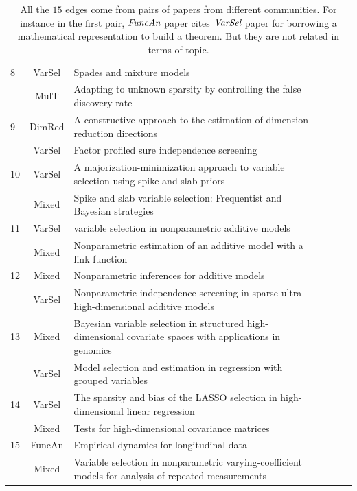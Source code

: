 \documentclass[AMS,STIX1COL]{WileyNJD-v2}
\begin{document}
{\begin{table}[htbp]
\begin{tabular}{lclclcl}
8    & VarSel    & Spades and mixture models & \\
     & MulT      & Adapting to unknown sparsity by controlling the false discovery rate                          & \\
9    & DimRed    & A constructive approach to the estimation of dimension reduction directions                   & \\
     & VarSel    & Factor profiled sure independence screening & \\
10   & VarSel    & A majorization-minimization approach to variable selection using spike and slab priors        & \\
     & Mixed     & Spike and slab variable selection: Frequentist and Bayesian strategies                        & \\
11   & VarSel    & variable selection in nonparametric additive models & \\
     & Mixed     & Nonparametric estimation of an additive model with a link function                            & \\
12   & Mixed     & Nonparametric inferences for additive models & \\
     & VarSel    & Nonparametric independence screening in sparse ultra-high-dimensional additive models         & \\
13   & Mixed     & Bayesian variable selection in structured high-dimensional covariate spaces with applications in genomics & \\
     & VarSel    & Model selection and estimation in regression with grouped variables                           & \\
14   & VarSel    & The sparsity and bias of the LASSO selection in high-dimensional linear regression            & \\
     & Mixed     & Tests for high-dimensional covariance matrices & \\
15   & FuncAn    & Empirical dynamics for longitudinal data & \\
     & Mixed     & Variable selection in nonparametric varying-coefficient models for analysis of repeated measurements   &       \\\hline
\end{tabular}
\caption{All the $15$ edges come from pairs of papers from different communities. For instance in the first pair, $\emph{FuncAn}$ paper cites $\emph{VarSel}$ paper for borrowing a mathematical representation to build a theorem. But they are not related in terms of topic.}
\end{table}
\label{tab:table2}

}
\end{document}
